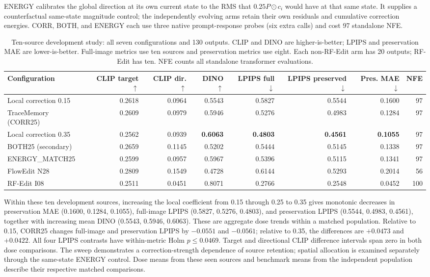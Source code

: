 ENERGY calibrates the global direction at its own current state to the RMS that $0.25P\odot c_i$ would have at that same state. It supplies a counterfactual same-state magnitude control; the independently evolving arms retain their own residuals and cumulative correction energies. CORR, BOTH, and ENERGY each use three native prompt-response probes (six extra calls) and cost 97 standalone NFE.

\begin{table}[t]
\centering\small
\caption{Ten-source development study: all seven configurations and 130 outputs. CLIP and DINO are higher-is-better; LPIPS and preservation MAE are lower-is-better. Full-image metrics use ten sources and preservation metrics use eight. Each non-RF-Edit arm has 20 outputs; RF-Edit has ten. NFE counts all standalone transformer evaluations.}
\label{tab:development-dose}
\label{tab:r84-dose}
\setlength{\tabcolsep}{4pt}
\begin{tabular}{lrrrrrrr}
\toprule
Configuration & CLIP target $\uparrow$ & CLIP dir. $\uparrow$ & DINO $\uparrow$ & LPIPS full $\downarrow$ & LPIPS preserved $\downarrow$ & Pres. MAE $\downarrow$ & NFE\\
\midrule
Local correction 0.15 & 0.2618 & 0.0964 & 0.5543 & 0.5827 & 0.5544 & 0.1600 & 97\\
TraceMemory (CORR25) & 0.2609 & 0.0979 & 0.5946 & 0.5276 & 0.4983 & 0.1284 & 97\\
Local correction 0.35 & 0.2562 & 0.0939 & \textbf{0.6063} & \textbf{0.4803} & \textbf{0.4561} & \textbf{0.1055} & 97\\
BOTH25 (secondary) & 0.2659 & 0.1145 & 0.5202 & 0.5444 & 0.5145 & 0.1338 & 97\\
ENERGY\_MATCH25 & 0.2599 & 0.0957 & 0.5967 & 0.5396 & 0.5115 & 0.1341 & 97\\
FlowEdit N28 & 0.2809 & 0.1549 & 0.4728 & 0.6144 & 0.5293 & 0.2014 & 56\\
RF-Edit I08 & 0.2511 & 0.0451 & 0.8071 & 0.2766 & 0.2548 & 0.0452 & 100\\
\bottomrule
\end{tabular}
\end{table}

Within these ten development sources, increasing the local coefficient from 0.15 through 0.25 to 0.35 gives monotonic decreases in preservation MAE (0.1600, 0.1284, 0.1055), full-image LPIPS (0.5827, 0.5276, 0.4803), and preservation LPIPS (0.5544, 0.4983, 0.4561), together with increasing mean DINO (0.5543, 0.5946, 0.6063). These are aggregate dose trends within a matched population. Relative to 0.15, CORR25 changes full-image and preservation LPIPS by $-0.0551$ and $-0.0561$; relative to 0.35, the differences are $+0.0473$ and $+0.0422$. All four LPIPS contrasts have within-metric Holm $p\leq0.0469$. Target and directional CLIP difference intervals span zero in both dose comparisons. The sweep demonstrates a correction-strength dependence of source retention; spatial allocation is examined separately through the same-state ENERGY control. Dose means from these seen sources and benchmark means from the independent population describe their respective matched comparisons.

